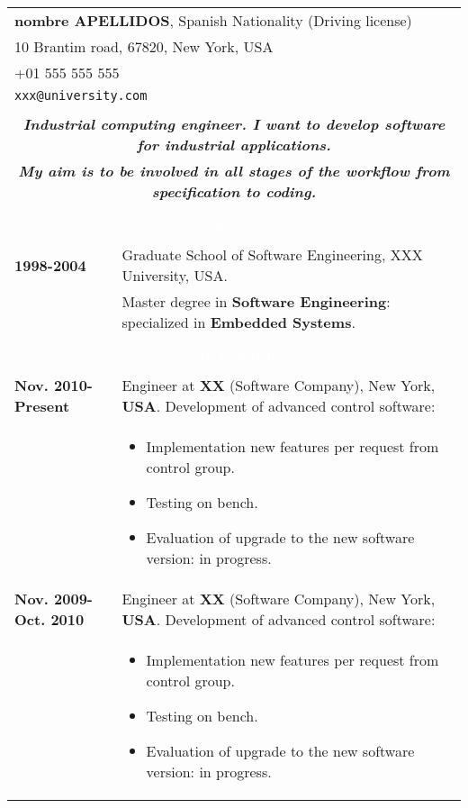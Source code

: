 \documentclass[twoside,a4paper,openright,10pt]{report}
\newcommand{\header}[1]{\multicolumn{2}{c}{\cellcolor{black} \textcolor{white}{#1}}\\}
\begin{document}
\begin{table}[ht]
\centering
\begin{tabular}{p{40mm} p{140mm}}

\multicolumn{2}{l}{\textbf{nombre APELLIDOS}, Spanish Nationality (Driving license)}\\
\multicolumn{2}{l}{10 Brantim road, 67820, New York, USA}\\
\multicolumn{2}{l}{+01 555 555 555}\\
\multicolumn{2}{l}{\texttt{xxx@university.com}}\\ \\
\multicolumn{2}{c}{\textbf{\textit{\large Industrial computing engineer. I want to develop software for industrial applications.}}}\\
\multicolumn{2}{c}{\textbf{\textit{\large My aim is to be involved in all stages of the workflow from specification to coding.}}}\\ \\

\header{Education} \\

\textbf{1998-2004} & Graduate School of Software Engineering, XXX University, USA.\\
 & Master degree in \textbf{Software Engineering}: specialized in \textbf{Embedded Systems}.\\
\\

\header{Work Experience} \\

\textbf{Nov. 2010-Present} & Engineer at \textbf{XX} (Software Company), New York, \textbf{USA}. Development of advanced control software:\\
& \vspace{-2mm} \begin{itemize}[noitemsep,nolistsep]
\item Implementation new features per request from control group.
\item Testing on bench.
\item Evaluation of upgrade to the new software version: in progress.
\vspace{-4mm}
\end{itemize}\\

\textbf{Nov. 2009-Oct. 2010} & Engineer at \textbf{XX} (Software Company), New York, \textbf{USA}. Development of advanced control software:\\
& \vspace{-2mm} \begin{itemize}[noitemsep,nolistsep]
\item Implementation new features per request from control group.
\item Testing on bench.
\item Evaluation of upgrade to the new software version: in progress.
\vspace{-4mm}
\end{itemize}\\


\end{tabular}
\end{table}
\end{document}
